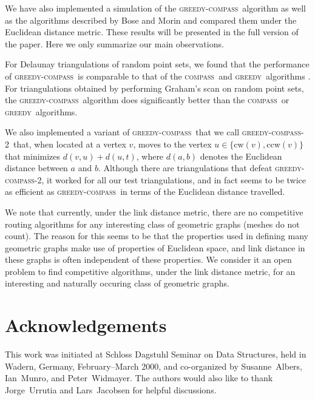 \documentclass{article}
\newcommand{\vdest}{t}
\newcommand{\cw}{\mathrm{cw}}
\newcommand{\ccw}{\mathrm{ccw}}
\newcommand{\gc}{\textsc{greedy-compass}}
\newcommand{\gct}{\textsc{greedy-compass-2}}
\newcommand{\compass}{\textsc{compass}}
\newcommand{\greedy}{\textsc{greedy}}
\begin{document}

We have also implemented a simulation of the \gc\ algorithm as well as
the algorithms described by Bose and Morin \cite{bm99a} and compared
them under the Euclidean distance metric. These results will be
presented in the full version of the paper.  Here we only summarize
our main observations.

For Delaunay triangulations of random point sets, we found that the
performance of \gc\ is comparable to that of the \compass\ and
\greedy\ algorithms \cite{bm99a,CuNeRo96,ksu99}.  For triangulations
obtained by performing Graham's scan \cite{g72} on random point sets,
the \gc\ algorithm does significantly better than the \compass\ or
\greedy\ algorithms.

We also implemented a variant of \gc\ that we call \gct\ that, when
located at a vertex $v$, moves to the vertex $u\in \{\cw(v),\ccw(v)\}$
that minimizes $d(v,u)+d(u,\vdest)$, where $d(a,b)$ denotes the
Euclidean distance between $a$ and $b$.  Although there are
triangulations that defeat \gct, it worked for all our test
triangulations, and in fact seems to be twice as efficient as \gc\ in
terms of the Euclidean distance travelled.

We note that currently, under the link distance metric, there are no
competitive routing algorithms for any interesting class of geometric
graphs (meshes do not count). The reason for this seems to be that the
properties used in defining many geometric graphs make use of
properties of Euclidean space, and link distance in these graphs is
often independent of these properties.  We consider it an open problem
to find competitive algorithms, under the link distance metric, for an
interesting and naturally occuring class of geometric graphs.

\section{Acknowledgements}

This work was initiated at Schloss Dagstuhl Seminar on Data
Structures, held in Wadern, Germany, February--March 2000, and
co-organized by \mbox{Susanne Albers}, \mbox{Ian Munro}, and
\mbox{Peter Widmayer}.  The authors would also like to thank
\mbox{Jorge Urrutia} and \mbox{Lars Jacobsen} for helpful discussions.



\end{document}

